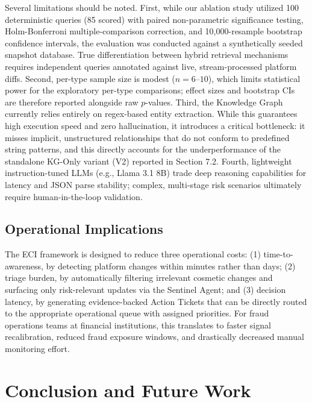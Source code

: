 \documentclass[
]{article}
\begin{document}
Several limitations should be noted. First, while our ablation study
utilized 100 deterministic queries (85 scored) with paired non-parametric
significance testing, Holm-Bonferroni multiple-comparison correction, and
10,000-resample bootstrap confidence intervals, the evaluation was conducted
against a synthetically seeded snapshot database. True differentiation
between hybrid retrieval mechanisms requires independent queries annotated
against live, stream-processed platform diffs. Second, per-type sample size
is modest ($n = 6$--$10$), which limits statistical power for the
exploratory per-type comparisons; effect sizes and bootstrap CIs are
therefore reported alongside raw $p$-values. Third, the Knowledge Graph
currently relies entirely on regex-based entity extraction. While this
guarantees high execution speed and zero hallucination, it introduces a
critical bottleneck: it misses implicit, unstructured relationships that
do not conform to predefined string patterns, and this directly accounts
for the underperformance of the standalone KG-Only variant (V2)
reported in Section 7.2. Fourth, lightweight instruction-tuned LLMs (e.g.,
Llama 3.1 8B) trade deep reasoning capabilities for latency and JSON parse
stability; complex, multi-stage risk scenarios ultimately require
human-in-the-loop validation.


\subsection{Operational Implications}\label{operational-implications}

The ECI framework is designed to reduce three operational costs: (1) time-to-awareness, by detecting platform changes within minutes rather than days; (2) triage burden, by automatically filtering irrelevant cosmetic changes and surfacing only risk-relevant updates via the Sentinel Agent; and (3) decision latency, by generating evidence-backed Action Tickets that can be directly routed to the appropriate operational queue with assigned priorities. For fraud operations teams at financial institutions, this translates to faster signal recalibration, reduced fraud exposure windows, and drastically decreased manual monitoring effort.

\section{Conclusion and Future
Work}\label{conclusion-and-future-work}
\end{document}

